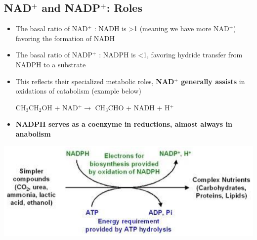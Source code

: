\documentclass[10pt]{article}
\begin{document}
\subsection*{NAD$^+$ and NADP$^+$: Roles}
\begin{itemize}
	\item The basal ratio of NAD$^+$ : NADH is >1 (meaning we have more NAD$^+$) favoring the formation of NADH
	\item The basal ratio of NADP$^+$ : NADPH is <1, favoring hydride transfer from NADPH to a substrate
	\item This reflects their specialized metabolic roles, \textbf{NAD$^+$ generally assists} in oxidations of catabolism (example below)
	\begin{center} 
        CH$_3$CH$_2$OH + NAD$^+ \rightarrow$ CH$_3$CHO + NADH + H$^+$
    \end{center}
	\item \textbf{NADPH serves as a coenzyme in reductions, almost always in anabolism}
\end{itemize}
\begin{center} 
	\includegraphics*[width=\textwidth]{L2_11.png}
\end{center}
\end{document}

